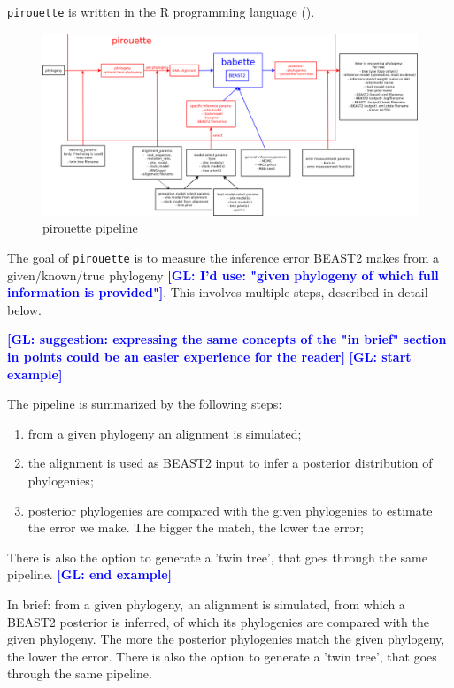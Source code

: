 \documentclass{article}
\newcommand{\giovanni}[1]{\textcolor{blue}{\textbf{[GL: #1]}}}
\begin{document}
\verb;pirouette; is written in the R programming language (\cite{R}).

\begin{figure}
  \centering
  \includegraphics[width=\textwidth]{overview.png}
  \caption{pirouette pipeline}
  \label{fig:pipeline}
\end{figure}

The goal of \verb;pirouette; is to measure the inference error BEAST2
makes from a given/known/true phylogeny \giovanni{I'd use: "given phylogeny of which full information is provided"}. This involves multiple steps,
described in detail below.


\giovanni{suggestion: expressing the same concepts of the "in brief" section in points could be an easier experience for the reader}
\giovanni{start example}


The pipeline is summarized by the following steps:
\begin{enumerate}
    \item from a given phylogeny an alignment is simulated;
    \item the alignment is used as BEAST2 input to infer a posterior distribution of phylogenies;
    \item posterior phylogenies are compared with the given phylogenies to estimate the error we make. The bigger the match, the lower the error;
\end{enumerate}
There is also the option to generate a 'twin tree',
that goes through the same pipeline.
\giovanni{end example}


In brief: from a given phylogeny, an alignment is simulated, from which a BEAST2
posterior is inferred, of which its phylogenies are compared with the given
phylogeny. The more the posterior phylogenies match the given phylogeny,
the lower the error. There is also the option to generate a 'twin tree',
that goes through the same pipeline.
\end{document}

